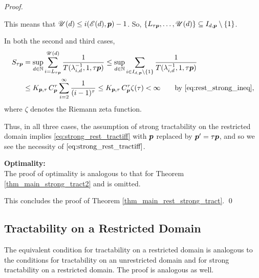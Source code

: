 \documentclass[sort&compress]{elsarticle}
\newcommand{\theM}{\mathscr{E}}
\newcommand{\theUB}{\mathscr{U}}
\begin{document}
\begin{proof}
\begin{enumerate}
{}
This means that $\theUB(d) \le i(\theM(d),\vp)-1$.  So, $\{L_{\tau\vp}, \ldots, \theUB(d)\} \subseteq I_{d,\vp} \setminus \{1\}$. 

In both the second and third cases,
\begin{align*}
S_{\tau\vp} & = \sup_{d\in\naturals} \sum_{i = L_{\tau\vp}}^{\theUB(d)} \frac{1}{T (\lambda_{i,d}^{-1},1, \tau \vp)}
\le 
\sup_{d\in\naturals} \sum_{i \in I_{d,\vp} \setminus\{1\} } \frac{1}{T (\lambda_{i,d}^{-1},1, \tau \vp)} \\
&  \le  K_{\vp,\tau}\, C_{\vp}^\tau
\sum_{i=2}^\infty \frac{1}{(i-1)^\tau}
 \le K_{\vp,\tau}\, C_{\vp}^\tau
\zeta (\tau) 
 < \infty \qquad \text{by \eqref{eq:rest_strong_ineq},}
\end{align*}
where $\zeta$ denotes the Riemann zeta function.

\end{enumerate}
Thus, in all three cases, the assumption of strong tractability on the restricted domain implies \eqref{eq:strong_rest_tractiff} with $\boldsymbol{p}$ replaced by $\boldsymbol{p}' = \tau \boldsymbol{p}$, and so we see the necessity of $\eqref{eq:strong_rest_tractiff}$.

\bigskip
\noindent \textbf{Optimality:} \\ 
The proof of optimality is analogous to that for Theorem \ref{thm_main_strong_tract2} and is omitted.

\bigskip

\noindent This concludes the proof of  Theorem \ref{thm_main_rest_strong_tract}.  \qed
\end{proof}

\subsection{Tractability on a Restricted Domain}


The equivalent condition for tractability on a restricted domain is analogous to the conditions for tractability on an unrestricted domain and for strong tractability on a restricted domain.  The proof is analogous as well.
\end{document}
